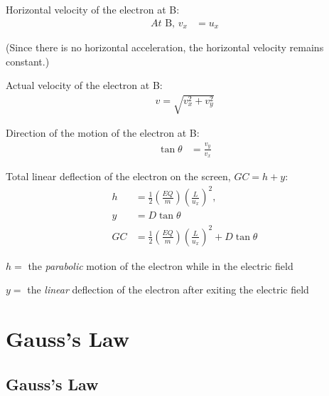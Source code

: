 \documentclass[../../../main.tex]{subfiles}
\begin{document}
\begin{mdframed}
    Horizontal velocity of the electron at B:
    \begin{align}
        At \text{ B, } v_x & =u_x
    \end{align}
    \begin{center}
        (Since there is no horizontal acceleration, the horizontal velocity remains constant.)
    \end{center}
\end{mdframed}

\begin{mdframed}
    Actual velocity of the electron at B:
    \begin{align}
        v=\sqrt{v_x^2+v_y^2}
    \end{align}
\end{mdframed}

\begin{mdframed}
    Direction of the motion of the electron at B:
    \begin{align}
        \tan{\theta} & =\frac{v_y}{v_x}
    \end{align}
\end{mdframed}

\pagebreak

\begin{mdframed}
    Total linear deflection of the electron on the screen, \(GC=h+y\):
    \begin{align*}
        h  & = \frac{1}{2}(\frac{EQ}{m})(\frac{L}{u_x})^2,               \\
        y  & = D \tan{\theta}                                            \\
        GC & = \frac{1}{2}(\frac{EQ}{m})(\frac{L}{u_x})^2+D \tan{\theta}
    \end{align*}
    \begin{center}
        \(h=\) the \emph{parabolic} motion of the electron while in the electric field

        \(y=\) the \emph{linear} deflection of the electron after exiting the electric field
    \end{center}
\end{mdframed}

\newpage

\section{Gauss's Law}
\subsection{Gauss's Law}
\end{document}
